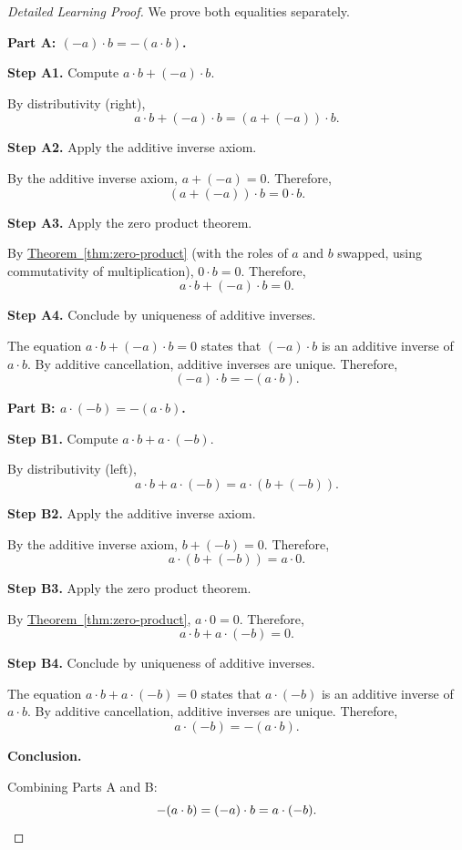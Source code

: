 \begin{proof}[Detailed Learning Proof]
\LRAProofBodyStart

We prove both equalities separately.

\textbf{Part A: $(-a)\cdot b = -(a\cdot b)$.}

\textbf{Step A1.} Compute $a\cdot b + (-a)\cdot b$.

By distributivity (right),
\[
a\cdot b + (-a)\cdot b = (a + (-a))\cdot b.
\]

\textbf{Step A2.} Apply the additive inverse axiom.

By the additive inverse axiom, $a + (-a) = 0$.  Therefore,
\[
(a + (-a))\cdot b = 0\cdot b.
\]

\textbf{Step A3.} Apply the zero product theorem.

By \hyperref[thm:zero-product]{Theorem~\ref*{thm:zero-product}} (with the
roles of $a$ and $b$ swapped, using commutativity of multiplication),
$0\cdot b = 0$.  Therefore,
\[
a\cdot b + (-a)\cdot b = 0.
\]

\textbf{Step A4.} Conclude by uniqueness of additive inverses.

The equation $a\cdot b + (-a)\cdot b = 0$ states that $(-a)\cdot b$ is an
additive inverse of $a\cdot b$.  By additive cancellation, additive inverses
are unique.  Therefore,
\[
(-a)\cdot b = -(a\cdot b).
\]

\textbf{Part B: $a\cdot(-b) = -(a\cdot b)$.}

\textbf{Step B1.} Compute $a\cdot b + a\cdot(-b)$.

By distributivity (left),
\[
a\cdot b + a\cdot(-b) = a\cdot(b + (-b)).
\]

\textbf{Step B2.} Apply the additive inverse axiom.

By the additive inverse axiom, $b + (-b) = 0$.  Therefore,
\[
a\cdot(b + (-b)) = a\cdot 0.
\]

\textbf{Step B3.} Apply the zero product theorem.

By \hyperref[thm:zero-product]{Theorem~\ref*{thm:zero-product}},
$a\cdot 0 = 0$.  Therefore,
\[
a\cdot b + a\cdot(-b) = 0.
\]

\textbf{Step B4.} Conclude by uniqueness of additive inverses.

The equation $a\cdot b + a\cdot(-b) = 0$ states that $a\cdot(-b)$ is an
additive inverse of $a\cdot b$.  By additive cancellation, additive inverses
are unique.  Therefore,
\[
a\cdot(-b) = -(a\cdot b).
\]

\textbf{Conclusion.}

Combining Parts A and B:
\[
-(a\cdot b) = (-a)\cdot b = a\cdot(-b). \qedhere
\]
\end{proof}

